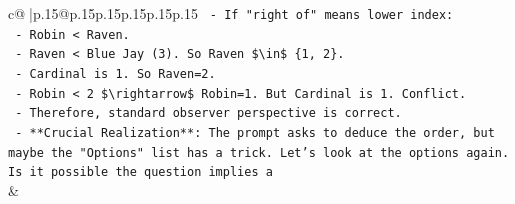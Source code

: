 \documentclass{article}
\begin{document}
{\begin{supertabular}{c@{$\;$}|p{.15\linewidth}@{}p{.15\linewidth}p{.15\linewidth}p{.15\linewidth}p{.15\linewidth}p{.15\linewidth}}
{{{\texttt{   {-} If "right of" means lower index:} \\
\texttt{     {-} Robin < Raven.} \\
\texttt{     {-} Raven < Blue Jay (3). So Raven \$\textbackslash{}in\$ \{1, 2\}.} \\
\texttt{     {-} Cardinal is 1. So Raven=2.} \\
\texttt{     {-} Robin < 2 \$\textbackslash{}rightarrow\$ Robin=1. But Cardinal is 1. Conflict.} \\
\texttt{   {-} Therefore, standard observer perspective is correct.} \\
\texttt{   {-} **Crucial Realization**: The prompt asks to deduce the order, but maybe the "Options" list has a trick. Let's look at the options again. Is it possible the question implies a} \\
            }
        }
    }
    & \\ \\

\end{supertabular}
}
\end{document}
